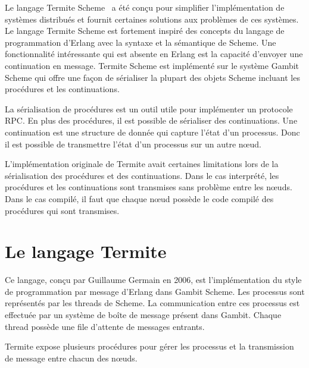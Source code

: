 Le langage Termite Scheme~\cite{DBLP:conf/erlang/Germain06} a été conçu
pour simplifier l'implémentation de systèmes distribués et fournit
certaines solutions aux problèmes de ces systèmes. Le langage Termite Scheme est
fortement inspiré des concepts du langage de programmation d'Erlang avec la
syntaxe et la sémantique de Scheme. Une fonctionnalité intéressante qui est
absente en Erlang est la capacité d'envoyer une continuation en message.
Termite Scheme est implémenté sur le système Gambit Scheme qui offre
une façon de sérialiser la plupart des objets Scheme incluant les
procédures et les continuations.

La sérialisation de procédures est un outil utile pour implémenter
un protocole RPC. En plus des procédures, il est possible de sérialiser
des continuations. Une continuation est une structure de donnée qui capture
l'état d'un processus. Donc il est possible de transmettre l'état d'un
processus sur un autre nœud.

L'implémentation originale de Termite avait certaines limitations
lors de la sérialisation des procédures et des continuations. Dans
le cas interprété, les procédures et les continuations sont transmises
sans problème entre les nœuds. Dans le cas compilé, il faut que
chaque nœud possède le code compilé des procédures qui sont transmises.


\section{Le langage Termite}

Ce langage, conçu par Guillaume Germain en 2006, est l'implémentation du style
de programmation par message d'Erlang dans Gambit Scheme.  Les processus sont
représentés par les threads de Scheme. La communication entre ces processus est
effectuée par un système de boîte de message présent dans Gambit. Chaque thread
possède une file d'attente de messages entrants.

Termite expose plusieurs procédures pour gérer les processus et la transmission
de message entre chacun des nœuds.

